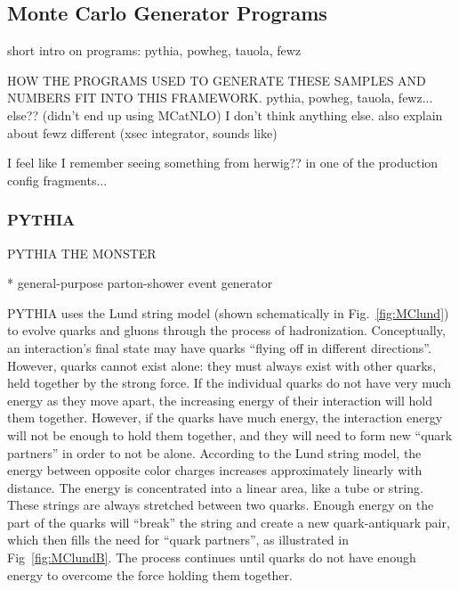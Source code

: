 \subsection{Monte Carlo Generator Programs}
\label{sim:MCGens}

short intro on programs: pythia, powheg, tauola, fewz

HOW THE PROGRAMS USED TO GENERATE THESE SAMPLES AND NUMBERS 
FIT INTO THIS FRAMEWORK.  
   pythia, powheg, tauola, fewz... else??  (didn't end up using MCatNLO) 
I don't think anything else.  
also explain about fewz different (xsec integrator, sounds like)

I feel like I remember seeing something from herwig?? in one of the 
production config fragments...

\subsubsection{PYTHIA}
\label{sim:MCGensPythia}

PYTHIA THE MONSTER

   * general-purpose parton-shower event generator


PYTHIA uses the Lund string model 
(shown schematically in Fig.~\ref{fig:MClund})
to evolve 
quarks and gluons through the process of hadronization. %
Conceptually, an interaction's final state may have 
quarks 
``flying off in different directions''.  
However, quarks cannot exist alone: %
they must always exist with other quarks, 
held together by the strong force.  
If the individual quarks do not have very much energy 
as they move apart, 
the increasing energy of their interaction will hold them together.  
However, if the quarks have much energy, 
the interaction energy will not be enough to hold 
them together, 
and they will need to form new ``quark partners'' 
in order to not be alone.  
According to the Lund string model, 
the energy between opposite color charges 
increases approximately linearly with distance. 
The energy is concentrated into a linear area, 
like a tube or string.  
These strings are always stretched between two quarks.  
Enough energy on the part of the quarks will 
``break'' the string and 
create a new quark-antiquark pair, 
which then fills the need for ``quark partners'', 
as illustrated in Fig~\ref{fig:MClundB}.  
The process continues until quarks 
do not have enough energy to overcome 
the force holding them together.  %

